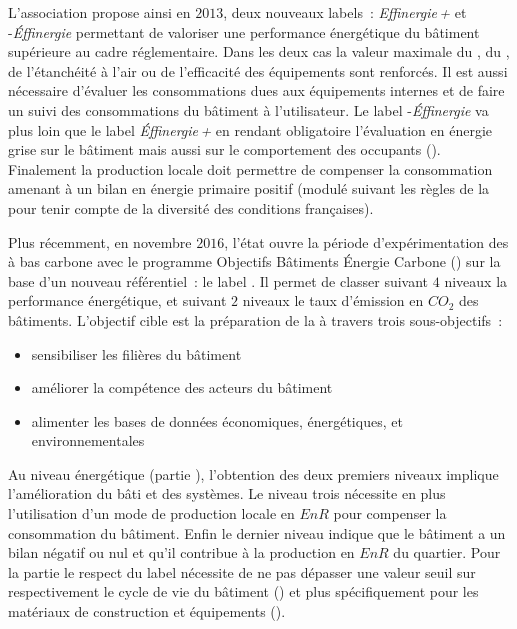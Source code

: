 L’association 
propose ainsi en $2013$, deux nouveaux labels~: \textit{Effinergie\,+} et
-\textit{Éffinergie} permettant de valoriser une performance énergétique du
bâtiment supérieure au cadre réglementaire. Dans les deux cas la valeur maximale du
, du , de l’étanchéité à l’air ou de l’efficacité des
équipements sont renforcés. Il est aussi nécessaire d’évaluer les consommations dues aux
équipements internes et de faire un suivi des consommations du bâtiment à l’utilisateur.
Le label -\textit{Éffinergie} va plus loin que le label \textit{Éffinergie\,+}
en rendant obligatoire l’évaluation en énergie grise sur le bâtiment mais aussi sur le
comportement des occupants ().
Finalement la production locale doit permettre de compenser la consommation amenant à un
bilan en énergie primaire positif (modulé suivant les règles de la  pour
tenir compte de la diversité des conditions françaises).

Plus récemment, en novembre $2016$, l’état ouvre la période d’expérimentation des
 à bas carbone avec le programme Objectifs Bâtiments Énergie Carbone
() sur la base d’un nouveau référentiel~: le label 
\parencite{Ministere2016}. Il permet de classer suivant $4$ niveaux la performance énergétique,
et suivant $2$ niveaux le taux d’émission en $CO_{2}$ des bâtiments.
L’objectif cible est la préparation de la  à travers trois sous-objectifs~:
\begin{itemize}
    \item sensibiliser les filières du bâtiment
    \item améliorer la compétence des acteurs du bâtiment
    \item alimenter les bases de données économiques, énergétiques, et environnementales
\end{itemize}
Au niveau énergétique (partie ), l’obtention des deux premiers niveaux implique
l’amélioration du bâti et des systèmes. Le niveau trois nécessite en plus l’utilisation
d’un mode de production locale en $EnR$ pour compenser la consommation du bâtiment. Enfin
le dernier niveau indique que le bâtiment a un bilan négatif ou nul et qu’il contribue à
la production en $EnR$ du quartier. Pour la partie  le respect du label nécessite
de ne pas dépasser une valeur seuil sur respectivement le cycle de vie du bâtiment
() et plus spécifiquement pour les matériaux de construction et
équipements ().

